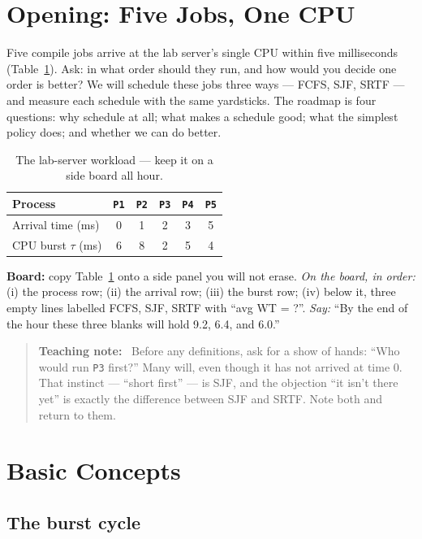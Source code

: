 \documentclass[11pt]{article}
\newenvironment{teachingaside}{\begin{quote}\small\color{primary-gold}\textbf{Teaching note:}\ }{\end{quote}}
\begin{document}
\section{Opening: Five Jobs, One CPU}

Five compile jobs arrive at the lab server's single CPU within five milliseconds (Table~\ref{tab:lab}). Ask: in what order should they run, and how would you decide one order is better? We will schedule these jobs three ways --- FCFS, SJF, SRTF --- and measure each schedule with the same yardsticks. The roadmap is four questions: why schedule at all; what makes a schedule good; what the simplest policy does; and whether we can do better.

\begin{table}[h]
\centering
\begin{tabular}{lccccc}
  \toprule
  Process & \texttt{P1} & \texttt{P2} & \texttt{P3} & \texttt{P4} & \texttt{P5} \\
  \midrule
  Arrival time (ms) & 0 & 1 & 2 & 3 & 5 \\
  CPU burst $\tau$ (ms) & 6 & 8 & 2 & 5 & 4 \\
  \bottomrule
\end{tabular}
\caption{The lab-server workload --- keep it on a side board all hour.}
\label{tab:lab}
\end{table}

\textbf{Board:} copy Table~\ref{tab:lab} onto a side panel you will not erase. \emph{On the board, in order:} (i) the process row; (ii) the arrival row; (iii) the burst row; (iv) below it, three empty lines labelled FCFS, SJF, SRTF with ``avg WT = ?''. \emph{Say:} ``By the end of the hour these three blanks will hold 9.2, 6.4, and 6.0.''

\begin{teachingaside}
Before any definitions, ask for a show of hands: ``Who would run \texttt{P3} first?'' Many will, even though it has not arrived at time 0. That instinct --- ``short first'' --- is SJF, and the objection ``it isn't there yet'' is exactly the difference between SJF and SRTF. Note both and return to them.
\end{teachingaside}

\section{Basic Concepts}

\subsection*{The burst cycle}
\end{document}
